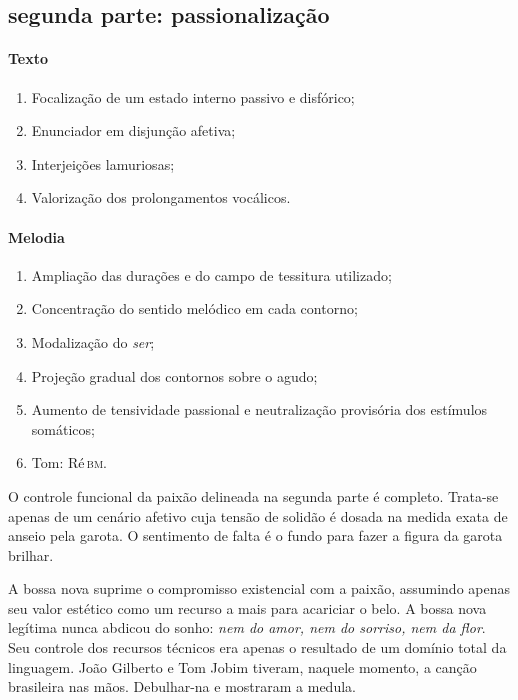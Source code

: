 \subsection{segunda parte: passionalização}


\paragraph{Texto}
\begin{enumerate}
\item Focalização de um estado interno passivo e disfórico;
\item Enunciador em disjunção afetiva;
\item Interjeições lamuriosas;
\item Valorização dos prolongamentos vocálicos.
\end{enumerate}

\paragraph{Melodia}
\begin{enumerate}
\item Ampliação das durações e do campo de tessitura utilizado;
\item Concentração do sentido melódico em cada contorno;
\item Modalização do \textit{ser};
\item Projeção gradual dos contornos sobre o agudo;
\item Aumento de tensividade passional e neutralização provisória dos estímulos somáticos;
\item Tom: Ré\,\textsc{bm}.
\end{enumerate}

O controle funcional da paixão delineada na segunda parte é completo.
Trata-se apenas de um cenário afetivo cuja tensão de solidão é dosada na
medida exata de anseio pela garota. O sentimento de falta é o fundo para
fazer a figura da garota brilhar.

A bossa nova suprime o compromisso existencial com a paixão, assumindo
apenas seu valor estético como um recurso a mais para acariciar o belo.
A bossa nova legítima nunca abdicou do sonho: \textit{nem do amor, nem do
sorriso, nem da flor}. Seu controle dos recursos técnicos era apenas o
resultado de um domínio total da linguagem. João Gilberto e Tom Jobim
tiveram, naquele momento, a canção brasileira nas mãos. Debulhar-na e
mostraram a medula.

